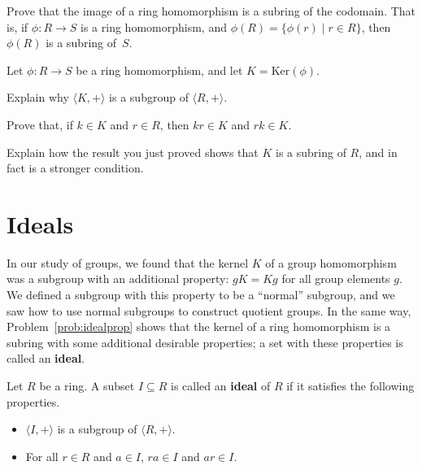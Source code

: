 \begin{problem}\label{prob:ringimage}
Prove that the image of a ring homomorphism is a subring of the codomain. That is, if \(\phi: R \longrightarrow S\) is a ring homomorphism, and \(\phi(R) = \{\phi(r) \mid r\in R\}\), then \(\phi(R)\) is a subring of~\(S\).
\begin{annotation}
\end{annotation}
\end{problem}

\begin{problem}\label{prob:idealprop}
Let \(\phi: R \longrightarrow S\) be a ring homomorphism, and let \(K = \mbox{Ker}(\phi)\).
\begin{problemparts}
  \item Explain why \(\langle K, + \rangle\) is a subgroup of \(\langle R, +\rangle \).
  \item Prove that, if \(k\in K\) and \(r \in R\), then \(kr \in K\) and \(rk \in K\).
\end{problemparts}
Explain how the result you just proved shows that \(K\) is a subring of \(R\), and in fact is a stronger condition.
\begin{annotation}
\end{annotation}
\end{problem}

\section{Ideals}
In our study of groups, we found that the kernel \(K\) of a group homomorphism was a subgroup with an additional property: \(gK = Kg\) for all group elements \(g\). We defined a subgroup with this property to be a ``normal'' subgroup, and we saw how to use normal subgroups to construct quotient groups. In the same way, Problem~\ref{prob:idealprop} shows that the kernel of a ring homomorphism is a subring with some additional desirable properties; a set with these properties is called an \textbf{ideal}.

\begin{definition}
Let \(R\) be a ring. A subset \(I \subseteq R\) is called an \textbf{ideal} of \(R\) if it satisfies the following properties.
\begin{itemize}
  \item \(\langle I, +\rangle \) is a subgroup of \(\langle R, + \rangle \).
  \item For all \(r \in R\) and \(a \in I\), \(ra \in I\) and \(ar \in I\).
\end{itemize}
\end{definition}

